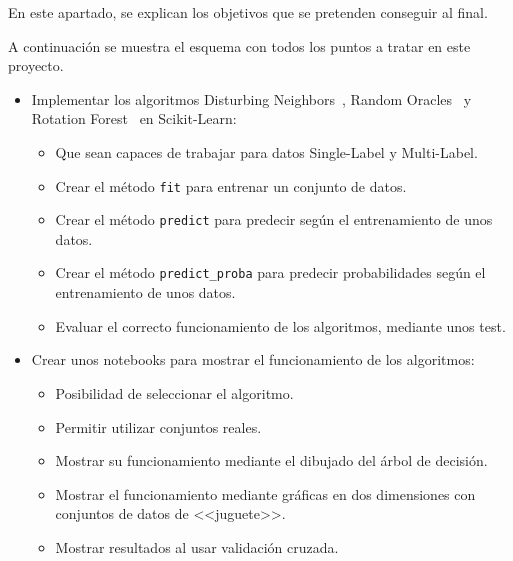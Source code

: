 
En este apartado,  se explican los objetivos que se pretenden conseguir al final.

A continuación se muestra el esquema con todos los puntos a tratar en este proyecto.
\begin{itemize}
\item Implementar los algoritmos Disturbing Neighbors~\cite{disturbingneighbors}, Random Oracles~\cite{randomoracles} y Rotation Forest~\cite{rotationforest} en Scikit-Learn:
	\begin{itemize}
		\item Que sean capaces de trabajar para datos Single-Label y Multi-Label.
		\item Crear el método \texttt{fit} para entrenar un conjunto de datos.
		\item Crear el método \texttt{predict} para predecir según el entrenamiento de unos datos.
		\item Crear el método \texttt{predict\_proba} para predecir probabilidades según el entrenamiento de unos datos.
		\item Evaluar el correcto funcionamiento de los algoritmos, mediante unos test.
	\end{itemize}
	
\item Crear unos notebooks para mostrar el funcionamiento de los algoritmos:
	\begin{itemize}
		\item Posibilidad de seleccionar el algoritmo.
		\item Permitir utilizar conjuntos reales.
		\item Mostrar su funcionamiento mediante el dibujado del árbol de decisión.
		\item Mostrar el funcionamiento mediante gráficas en dos dimensiones con conjuntos de datos de <<juguete>>.
		\item Mostrar resultados al usar validación cruzada.
	\end{itemize}
\end{itemize}
